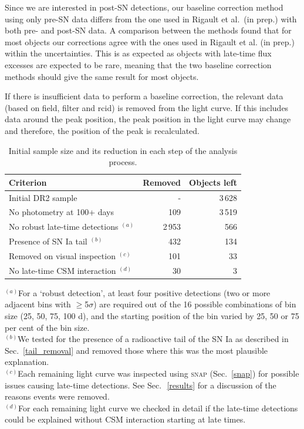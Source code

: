 \documentclass[a4paper,oneside,12pt, class=Latex/Classes/PhDthesisPSnPDF, crop=false]{standalone}
\begin{document}
Since we are interested in post-SN detections, our baseline correction method using only pre-SN data differs from the one used in Rigault et al.~(in prep.) with both pre- and post-SN data. A comparison between the methods found that for most objects our corrections agree with the ones used in Rigault et al. (in prep.) within the uncertainties. This is as expected as objects with late-time flux excesses are expected to be rare, meaning that the two baseline correction methods should give the same result for most objects. 

If there is insufficient data to perform a baseline correction, the relevant data (based on field, filter and rcid) is removed from the light curve. If this includes data around the peak position, the peak position in the light curve may change and therefore, the position of the peak is recalculated. 


\begin{table}
 \centering
 \caption{Initial sample size and its reduction in each step of the analysis process.}
 \begin{tabular}{lrr}
  \hline
  Criterion & Removed & Objects left\\
  \hline
  Initial DR2 sample & - & 3\,628\\
  No photometry at 100+ days & 109 & 3\,519\\
   No robust late-time detections $^{(a)}$ & 2\,953 & 566\\
  Presence of SN Ia tail $^{(b)}$ & 432 & 134\\
  Removed on visual inspection $^{(c)}$ & 101 & 33\\
  No late-time CSM interaction $^{(d)}$ & 30 & 3\\
  \hline
 \end{tabular}
 \label{obj_breakdown}
\begin{flushleft}
$^{(a)}$For a `robust detection', at least four positive detections (two or more adjacent bins with $\ge$5$\sigma$) are required out of the 16 possible combinations of bin size (25, 50, 75, 100 d), and the starting position of the bin varied by 25, 50 or 75 per cent of the bin size. \\
$^{(b)}$We tested for the presence of a radioactive tail of the SN Ia as described in Sec.~\ref{tail_removal} and removed those where this was the most plausible explanation. \\
$^{(c)}$Each remaining light curve was inspected using \textsc{snap} (Sec.~\ref{snap}) for possible issues causing late-time detections. See Sec.\,~\ref{results} for a discussion of the reasons events were removed.\\
$^{(d)}$For each remaining light curve we checked in detail if the late-time detections could be explained without CSM interaction starting at late times.
\end{flushleft}
\end{table}
\end{document}
